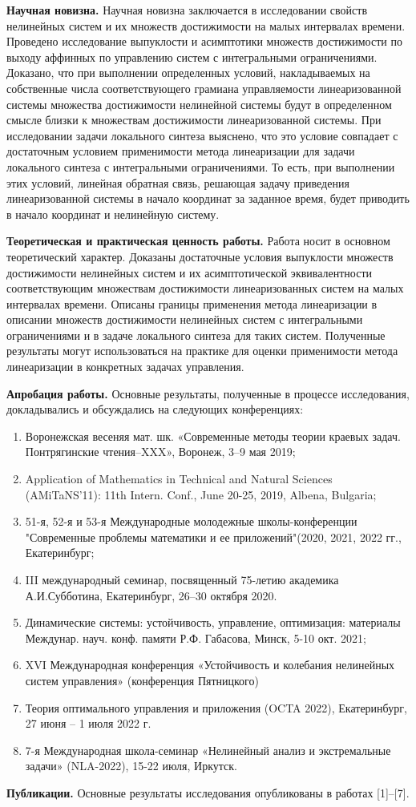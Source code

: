 \documentclass[../main.tex]{subfiles}
\begin{document}
\textbf{Научная новизна.} Научная новизна заключается в исследовании свойств нелинейных систем и их множеств достижимости на малых интервалах времени. Проведено исследование выпуклости и асимптотики множеств достижимости по выходу аффинных по управлению систем с интегральными ограничениями. Доказано, что при выполнении определенных условий, накладываемых на собственные числа соответствующего грамиана управляемости линеаризованной системы множества достижимости нелинейной системы будут в определенном смысле близки к множествам достижимости линеаризованной системы. При исследовании задачи локального синтеза выяснено, что это условие совпадает с достаточным условием применимости метода линеаризации для задачи локального синтеза с интегральными ограничениями. То есть, при выполнении этих условий, линейная обратная связь, решающая задачу приведения линеаризованной системы в начало координат за заданное время, будет приводить в начало координат и нелинейную систему.

\textbf{Теоретическая и практическая ценность работы.} Работа носит в основном теоретический характер. Доказаны достаточные условия выпуклости множеств достижимости нелинейных систем и их асимптотической эквивалентности соответствующим множествам достижимости линеаризованных систем на малых интервалах времени. Описаны границы применения метода линеаризации в описании множеств достижимости нелинейных систем с интегральными ограничениями и в задаче локального синтеза для таких систем. Полученные результаты могут использоваться на практике для оценки применимости метода линеаризации в конкретных задачах управления.
	
\textbf{Апробация работы.}  Основные результаты, полученные в процессе исследования, докладывались и обсуждались на следующих конференциях:
\begin{enumerate}
	\item Воронежская весеняя мат. шк. «Современные методы теории краевых задач. Понтрягинские чтения–XXX», Воронеж, 3–9 мая 2019;
	\item Application of Mathematics in Technical and Natural Sciences (AMiTaNS’11): 11th Intern. Conf., June 20-25, 2019, Albena, Bulgaria;
	\item 51-я, 52-я и 53-я Международные молодежные школы-конференции "Современные проблемы математики и ее приложений"(2020, 2021, 2022 гг., Екатеринбург;
	\item III международный семинар, посвященный 75-летию академика А.И.Субботина, Екатеринбург, 26–30 октября 2020.
	\item Динамические системы: устойчивость, управление, оптимизация: материалы Междунар. науч. конф. памяти Р.Ф. Габасова, Минск, 5-10 окт. 2021;
	\item XVI Международная конференция «Устойчивость и колебания нелинейных систем управления» (конференция Пятницкого) 
	\item Теория оптимального управления и приложения (OCTA 2022),
Екатеринбург, 27 июня – 1 июля 2022 г.
	\item 7-я Международная школа-семинар  «Нелинейный анализ и экстремальные задачи» (NLA-2022), 15-22 июля, Иркутск.
\end{enumerate}
	
\textbf{Публикации.} Основные результаты исследования опубликованы в работах [1]--[7].
\end{document}
